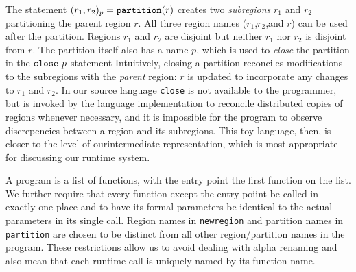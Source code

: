 The statement $(r_1, r_2)_{p} = \mbox{\tt partition}(r)$
creates two {\em subregions} $r_1$ and $r_2$ partitioning the parent
region $r$.  All three region names ($r_1$,$r_2$,and $r$) can be used
after the partition.  Regions $r_1$ and $r_2$ are disjoint but neither
$r_1$ nor $r_2$ is disjoint from $r$.  The partition itself also has a name $p$,
which is used to {\em close} the partition in the $\mbox{\tt close}\ p$ statement 
Intuitively, closing a partition reconciles modifications to the subregions with the {\em parent} region: 
$r$ is updated to incorporate any changes to $r_1$ and $r_2$.  In our source language {\tt close} is not
available to the programmer, but is invoked by the language implementation to reconcile distributed copies
of regions whenever necessary, and it is impossible for the program to observe discrepencies between
a region and its subregions. This toy language, then, is closer to the level of ourintermediate representation,
which is most appropriate for discussing our runtime system.

A program is a list of functions, with the entry point the first function on the list.
We further require that every function except the entry poiint be called in exactly one place
and to have its formal parameters be identical to the actual parameters in its single call.
Region names in {\tt newregion} and partition names in {\tt partition} are chosen to be distinct from
all other region/partition names in the program.  These restrictions allow us to avoid dealing with
alpha renaming and also mean that each runtime call is uniquely named by its function name.












